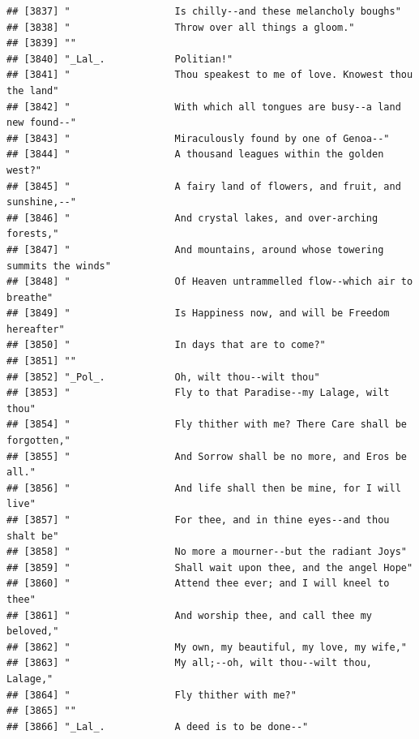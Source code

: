 \documentclass{article}\usepackage[]{graphicx}\usepackage[]{color}
\makeatletter
\newenvironment{kframe}{%
 \def\at@end@of@kframe{}%
 \ifinner\ifhmode%
  \def\at@end@of@kframe{\end{minipage}}%
  \begin{minipage}{\columnwidth}%
 \fi\fi%
 \def\FrameCommand##1{\hskip\@totalleftmargin \hskip-\fboxsep
 \colorbox{shadecolor}{##1}\hskip-\fboxsep
     \hskip-\linewidth \hskip-\@totalleftmargin \hskip\columnwidth}%
 \MakeFramed {\advance\hsize-\width
   \@totalleftmargin\z@ \linewidth\hsize
   \@setminipage}}%
 {\par\unskip\endMakeFramed%
 \at@end@of@kframe}
\newenvironment{knitrout}{}{} %
\makeatother
\begin{document}
\begin{knitrout}
\begin{kframe}
\begin{verbatim}
## [3837] "                  Is chilly--and these melancholy boughs"                    
## [3838] "                  Throw over all things a gloom."                            
## [3839] ""                                                                            
## [3840] "_Lal_.            Politian!"                                                 
## [3841] "                  Thou speakest to me of love. Knowest thou the land"        
## [3842] "                  With which all tongues are busy--a land new found--"       
## [3843] "                  Miraculously found by one of Genoa--"                      
## [3844] "                  A thousand leagues within the golden west?"                
## [3845] "                  A fairy land of flowers, and fruit, and sunshine,--"       
## [3846] "                  And crystal lakes, and over-arching forests,"              
## [3847] "                  And mountains, around whose towering summits the winds"    
## [3848] "                  Of Heaven untrammelled flow--which air to breathe"         
## [3849] "                  Is Happiness now, and will be Freedom hereafter"           
## [3850] "                  In days that are to come?"                                 
## [3851] ""                                                                            
## [3852] "_Pol_.            Oh, wilt thou--wilt thou"                                  
## [3853] "                  Fly to that Paradise--my Lalage, wilt thou"                
## [3854] "                  Fly thither with me? There Care shall be forgotten,"       
## [3855] "                  And Sorrow shall be no more, and Eros be all."             
## [3856] "                  And life shall then be mine, for I will live"              
## [3857] "                  For thee, and in thine eyes--and thou shalt be"            
## [3858] "                  No more a mourner--but the radiant Joys"                   
## [3859] "                  Shall wait upon thee, and the angel Hope"                  
## [3860] "                  Attend thee ever; and I will kneel to thee"                
## [3861] "                  And worship thee, and call thee my beloved,"               
## [3862] "                  My own, my beautiful, my love, my wife,"                   
## [3863] "                  My all;--oh, wilt thou--wilt thou, Lalage,"                
## [3864] "                  Fly thither with me?"                                      
## [3865] ""                                                                            
## [3866] "_Lal_.            A deed is to be done--"                                    

\end{verbatim}
\end{kframe}
\end{knitrout}
\end{document}
